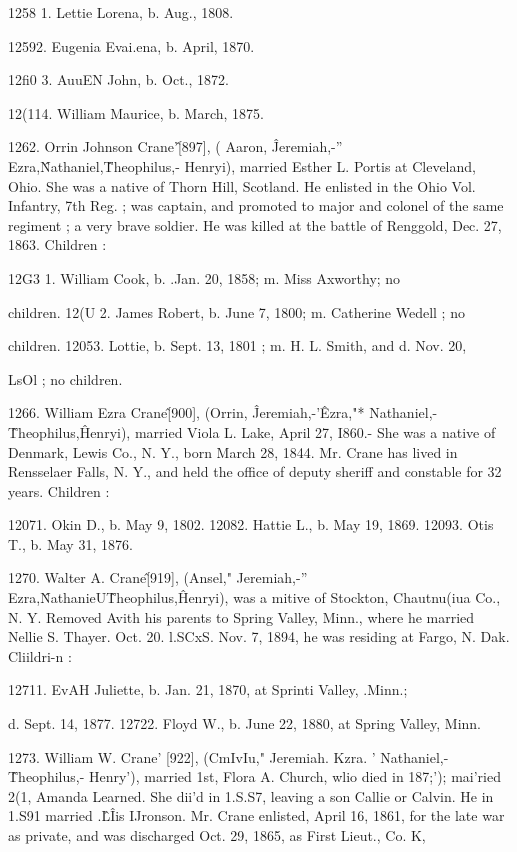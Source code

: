 \documentclass{book}
\begin{document}
1258  1. Lettie Lorena, b. Aug., 1808. 

12592. Eugenia Evai.ena, b. April, 1870. 

12fi0 3. AuuEN John, b. Oct., 1872. 

12(114. William Maurice, b. March, 1875. 

1262. Orrin Johnson Crane'\^ [897], ( Aaron, \^ Jeremiah,-'' 
Ezra,\^ Nathaniel,\^ Theophilus,- Henryi), married Esther L. 
Portis at Cleveland, Ohio. She was a native of Thorn Hill, 
Scotland. He enlisted in the Ohio Vol. Infantry, 7th Reg. ; was 
captain, and promoted to major and colonel of the same regiment ; 
a very brave soldier. He was killed at the battle of Renggold, 
Dec. 27, 1863. Children : 

12G3  1. William Cook, b. .Jan. 20, 1858; m. Miss Axworthy; no 

children. 
12(U 2. James Robert, b. June 7, 1800; m. Catherine Wedell ; no 

children. 
12053. Lottie, b. Sept. 13, 1801 ; m. H. L. Smith, and d. Nov. 20, 

LsOl ; no children. 

1266. William Ezra Crane\^ [900], (Orrin, \^ Jeremiah,-'\^ 
Ezra,"* Nathaniel,-\^ Theophilus,\^ Henryi), married Viola L. Lake, 
April 27, I860.- She was a native of Denmark, Lewis Co., N. 
Y., born March 28, 1844. Mr. Crane has lived in Rensselaer 
Falls, N. Y., and held the office of deputy sheriff and constable 
for 32 years. Children : 

12071. Okin D., b. May 9, 1802. 
12082. Hattie L., b. May 19, 1869. 
12093. Otis T., b. May 31, 1876. 

1270. Walter A. Crane\^ [919], (Ansel," Jeremiah,-'' Ezra,\^ 
NathanieU\^ Theophilus,\^ Henryi), was a mitive of Stockton, 
Chautnu(iua Co., N. Y. Removed Avith his parents to Spring 
Valley, Minn., where he married Nellie S. Thayer. Oct. 20. l.SCxS. 
Nov. 7, 1894, he was residing at Fargo, N. Dak. Cliildri-n : 

12711. EvAH Juliette, b. Jan. 21, 1870, at Sprinti Valley, .Minn.; 

d. Sept. 14, 1877. 
12722. Floyd W., b. June 22, 1880, at Spring Valley, Minn. 

1273. William W. Crane' [922], (CmIvIu," Jeremiah.  Kzra. ' 
Nathaniel,-\^ Theophilus,- Henry'), married 1st, Flora A. Church, 
wlio died in 187;'); mai'ried 2(1, Amanda Learned. She dii'd in 
1.S.S7, leaving a son Callie or Calvin. He in 1.S91 married .\^L\^Iis 
IJronson. Mr. Crane enlisted, April 16, 1861, for the late war as 
private, and was discharged Oct. 29, 1865, as First Lieut., Co. K, 
\end{document}

